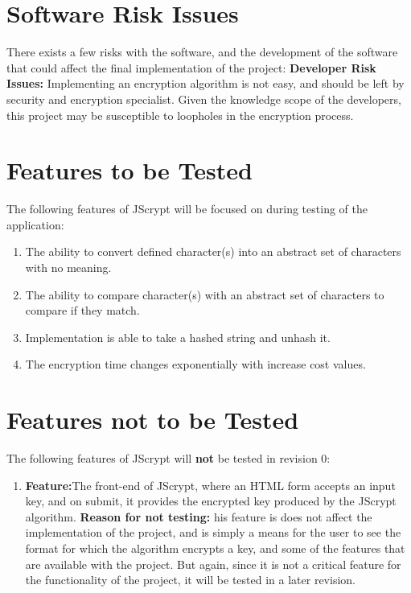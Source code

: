 \documentclass[12pt]{article}
\begin{document}
\section{Software Risk Issues}
There exists a few risks with the software, and the development of the software that could affect the final implementation of the project:
\textbf{Developer Risk Issues:} Implementing an encryption algorithm is not easy, and should be left by security	and encryption specialist. Given the knowledge scope of the developers, this project may be susceptible to loopholes in the encryption process.


\section{ Features to be Tested}
The following features of JScrypt will be focused on during testing of the application:
\begin{enumerate}
  \item The ability to convert defined character(s) into an abstract set of characters with no meaning.
  \item The ability to compare character(s) with an abstract set of characters to compare if they match.
  \item Implementation is able to take a hashed string and unhash it.
  \item The encryption time changes exponentially with increase cost values.
 \end{enumerate}



\section{Features not to be Tested}
The following features of JScrypt will \textbf{not} be tested in revision 0:

\begin{enumerate}
  \item \textbf{Feature:}The front-end of JScrypt, where an HTML form accepts an input key, and on submit, it provides the encrypted key produced by the JScrypt algorithm. \newline
  \textbf{Reason for not testing:} his feature is does not affect the implementation of the project, and is simply a means for the user to see the format for which the algorithm encrypts a key, and some of the features that are available with the project. But again, since it is not a critical feature for the functionality of the project, it will be tested in a later revision.


 \end{enumerate}
\end{document}
